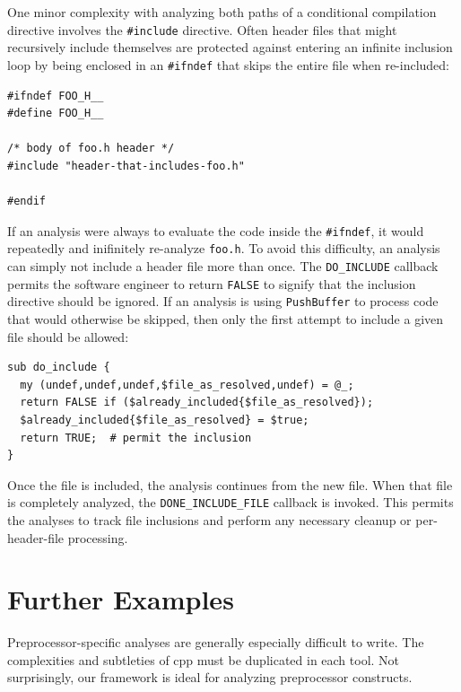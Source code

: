\documentclass{article}
\newcommand{\Cpp}{\mbox{\textsf{cpp}}}
\newcommand{\ppd}[1]{\texttt{\##1}}
\newcommand{\file}[1]{{\small \texttt{#1}}}
\begin{document}
One minor complexity with analyzing both paths of a conditional
compilation directive involves the \ppd{include} directive.  Often
header files that might recursively include themselves are protected
against entering an infinite inclusion loop by being enclosed in an
\ppd{ifndef} that skips the entire file when re-included:

\begin{verbatim}
#ifndef FOO_H__
#define FOO_H__

/* body of foo.h header */
#include "header-that-includes-foo.h"

#endif
\end{verbatim}

If an analysis were always to evaluate the code inside the \ppd{ifndef},
it would repeatedly and inifinitely re-analyze \file{foo.h}.  To avoid
this difficulty, an analysis can simply not include a header file more
than once.  The \texttt{DO\_INCLUDE} callback permits the software
engineer to return \texttt{FALSE} to signify that the inclusion
directive should be ignored.  If an analysis is using
\texttt{PushBuffer} to process code that would otherwise be skipped,
then only the first attempt to include a given file should be allowed:

\begin{verbatim}
sub do_include { 
  my (undef,undef,undef,$file_as_resolved,undef) = @_;
  return FALSE if ($already_included{$file_as_resolved});
  $already_included{$file_as_resolved} = $true;
  return TRUE;  # permit the inclusion
}
\end{verbatim}

Once the file is included, the analysis continues from the new file.
When that file is completely analyzed, the \texttt{DONE\_INCLUDE\_FILE}
callback is invoked.  This permits the analyses to track file inclusions 
and perform any necessary cleanup or per-header-file processing.


\section{Further Examples}
\label{sec:further_examples}

Preprocessor-specific analyses are generally especially difficult to
write.  The complexities and subtleties of \Cpp{} must be duplicated in
each tool.  Not surprisingly, our framework is ideal for analyzing
preprocessor constructs.
\end{document}
